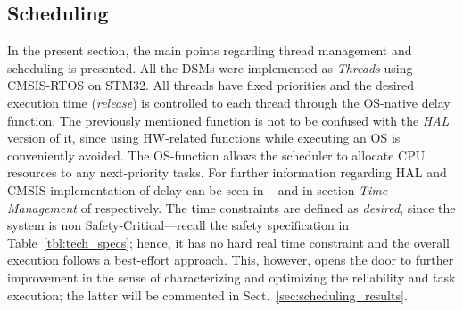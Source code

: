\subsection{Scheduling}\label{sec:scheduling_intro}

        
     

In the present section, the main points regarding thread management and scheduling is presented.
All the DSMs were implemented as \emph{Threads} using CMSIS-RTOS on STM32. All threads have fixed priorities and the desired execution time
(\emph{release}) is controlled to each thread through the OS-native delay function. The previously mentioned function is not to be confused 
with the \emph{HAL} version of it, since using HW-related functions while executing an OS is conveniently avoided. The OS-function allows 
the scheduler to allocate CPU resources to any next-priority tasks. For further information regarding HAL and CMSIS implementation of delay
can be seen in ~\cite{hal_drivers} and in section \emph{Time Management} of \cite{cmsis_doc} respectively.
The time constraints are defined as \emph{desired}, since the system is
non Safety-Critical---recall the safety specification in Table~\ref{tbl:tech_specs}; hence, it has no hard real time constraint and the overall 
execution follows a best-effort approach. This, however, opens the door to further improvement in the sense of characterizing and optimizing
the reliability and task execution; the latter will be commented in Sect.~\ref{sec:scheduling_results}. 

